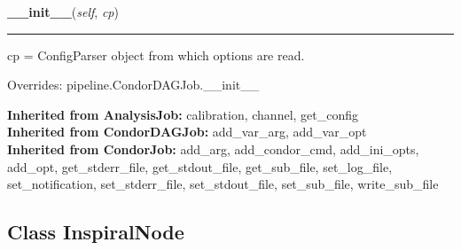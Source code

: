     \label{inspiral:InspiralJob:__init__}
    \vspace{0.5ex}

    \noindent\begin{boxedminipage}{\textwidth}

    \raggedright \textbf{\_\_init\_\_}(\textit{self}, \textit{cp})

    \vspace{-1.5ex}

    \rule{\textwidth}{0.5\fboxrule}
    cp = ConfigParser object from which options are read.

    \vspace{1ex}

      Overrides: pipeline.CondorDAGJob.\_\_init\_\_

    \end{boxedminipage}

  \noindent\textbf{Inherited from AnalysisJob:}
    calibration,
    channel,
    get\_config
    \\
  \noindent\textbf{Inherited from CondorDAGJob:}
    add\_var\_arg,
    add\_var\_opt
    \\
  \noindent\textbf{Inherited from CondorJob:}
    add\_arg,
    add\_condor\_cmd,
    add\_ini\_opts,
    add\_opt,
    get\_stderr\_file,
    get\_stdout\_file,
    get\_sub\_file,
    set\_log\_file,
    set\_notification,
    set\_stderr\_file,
    set\_stdout\_file,
    set\_sub\_file,
    write\_sub\_file


\subsection{Class InspiralNode}

